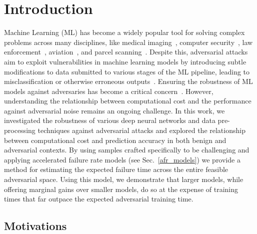 \section{Introduction}

Machine Learning (ML) has become a widely popular tool for solving complex problems across many disciplines, like medical imaging~\citep{ai_medical_imaging}, computer security~\citep{ai_security}, law enforcement~\citep{ai_prison}, aviation~\citep{ai_aviation}, and parcel scanning~\cite{ai_luggage}. Despite this, adversarial attacks aim to exploit vulnerabilities in machine learning models by introducing subtle modifications to data submitted to various stages of the ML pipeline, leading to misclassification or otherwise erroneous outputs~\citep{chakraborty_adversarial_2018}. Ensuring the robustness of ML models against adversaries has become a critical concern~\citep{adversarialpatch,carlini_towards_2017,croce_reliable_2020,hopskipjump,art2018,meyers}. However, understanding the relationship between computational cost and the performance against adversarial noise remains an ongoing challenge.  In this work, we investigated the robustness of various deep neural networks and data pre-processing techniques against adversarial attacks and explored the relationship between computational cost and  prediction accuracy in both benign and adversarial contexts.  By using samples crafted specifically to be challenging and applying accelerated failure rate models (see Sec.~\ref{afr_models}) we provide a method for estimating the expected failure time across the entire feasible adversarial space. Using this model, we demonstrate that larger models, while offering marginal gains over smaller models, do so at the expense of training times that far outpace the expected adversarial training time.

\subsection{Motivations}

